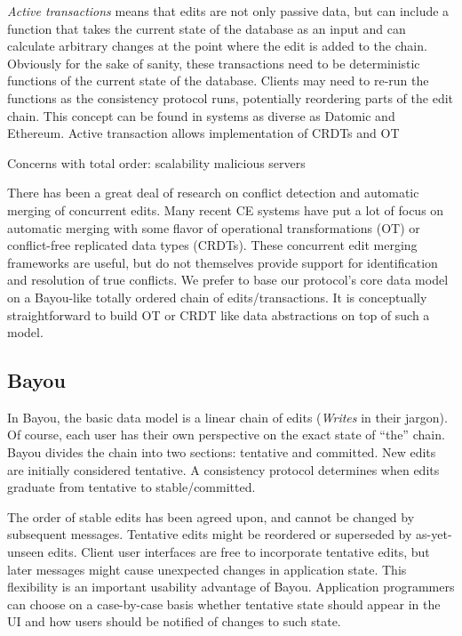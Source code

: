 \documentclass[runningheads]{llncs}
\begin{document}
\emph{Active transactions} means that edits are not only passive data, but can include a function that takes the current state of the database as an input and can calculate arbitrary changes at the point where the edit is added to the chain.
Obviously for the sake of sanity, these transactions need to be deterministic functions of the current state of the database.
Clients may need to re-run the functions as the consistency protocol runs, potentially reordering parts of the edit chain.
This concept can be found in systems as diverse as Datomic and Ethereum.
Active transaction allows implementation of CRDTs and OT

Concerns with total order:
scalability
malicious servers

There has been a great deal of research on conflict detection and automatic merging of concurrent edits.
Many recent CE systems have put a lot of focus on automatic merging with some flavor of operational transformations (OT) or conflict-free replicated data types (CRDTs).
These concurrent edit merging frameworks are useful, but do not themselves provide support for identification and resolution of true conflicts.
We prefer to base our protocol's core data model on a Bayou-like totally ordered chain of edits{\slash}transactions.
It is conceptually straightforward to build OT or CRDT like data abstractions on top of such a model.

\subsection{Bayou}

In Bayou, the basic data model is a linear chain of edits (\emph{Writes} in their jargon).
Of course, each user has their own perspective on the exact state of ``the'' chain.
Bayou divides the chain into two sections: tentative and committed.
New edits are initially considered tentative.
A consistency protocol determines when edits graduate from tentative to stable{\slash}committed.

The order of stable edits has been agreed upon, and cannot be changed by subsequent messages.
Tentative edits might be reordered or superseded by as-yet-unseen edits.
Client user interfaces are free to incorporate tentative edits, but later messages might cause unexpected changes in application state.
This flexibility is an important usability advantage of Bayou.
Application programmers can choose on a case-by-case basis whether tentative state should appear in the UI and how users should be notified of changes to such state.
\end{document}
